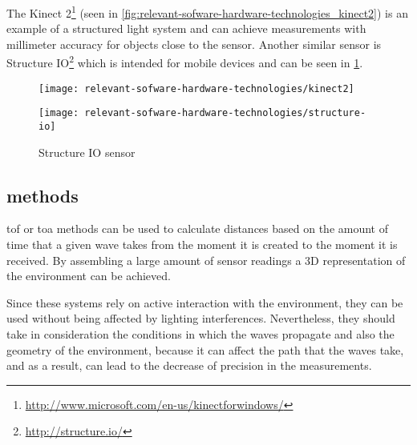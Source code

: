 The Kinect 2\footnote{\url{http://www.microsoft.com/en-us/kinectforwindows/}} (seen in \cref{fig:relevant-sofware-hardware-technologies_kinect2}) is an example of a structured light system and can achieve measurements with millimeter accuracy for objects close to the sensor. Another similar sensor is Structure IO\footnote{\url{http://structure.io/}} which is intended for mobile devices and can be seen in \cref{fig:relevant-sofware-hardware-technologies_structure-io}.

\begin{savenotes}
\begin{figure}[H]
	\centering
	\begin{minipage}[h]{.47\textwidth}
		\centering
		\texttt{[image: relevant-sofware-hardware-technologies/kinect2]}
		\caption[Kinect 2 sensor]{Kinect 2 sensor\protect\footnotemark}
		\label{fig:relevant-sofware-hardware-technologies_kinect2}
	\end{minipage}\hfill
	\begin{minipage}[h]{.47\textwidth}
		\centering
		\texttt{[image: relevant-sofware-hardware-technologies/structure-io]}
		\caption[Structure IO sensor]{Structure IO sensor\protect\footnotemark}
		\label{fig:relevant-sofware-hardware-technologies_structure-io}
	\end{minipage}
\end{figure}
\end{savenotes}



\subsection{ methods}\label{sec:relevant-sofware-hardware-technologies_tof-methods}

\gls{tof} or \gls{toa} methods can be used to calculate distances based on the amount of time that a given wave takes from the moment it is created to the moment it is received. By assembling a large amount of sensor readings a 3D representation of the environment can be achieved.

Since these systems rely on active interaction with the environment, they can be used without being affected by lighting interferences. Nevertheless, they should take in consideration the conditions in which the waves propagate and also the geometry of the environment, because it can affect the path that the waves take, and as a result, can lead to the decrease of precision in the measurements.


